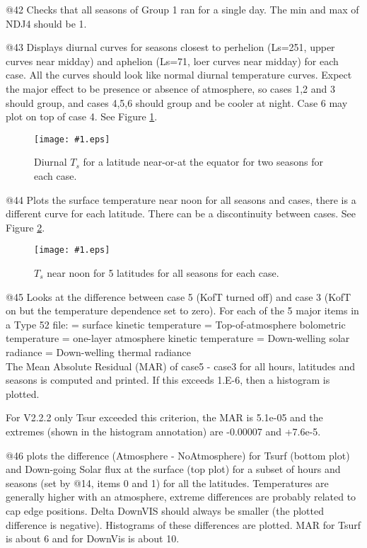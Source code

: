 \documentclass{article}  %
\newcommand{\igc}[1]{\texttt{[image: \#1.eps]}}
\begin{document}
@42 Checks that all seasons of Group 1 ran for a single day. The min and max of
NDJ4 should be 1.

@43 Displays diurnal curves for seasons closest to perhelion (Ls=251, upper
curves near midday) and aphelion (Ls=71, loer curves near midday) for each
case. All the curves should look like normal diurnal temperature curves. Expect
the major effect to be presence or absence of atmosphere, so cases 1,2 and 3
should group, and cases 4,5,6 should group and be cooler at night. Case 6 may
plot on top of case 4.  See Figure \ref{p43}. 

\begin{figure}[!ht] \igc{p43}
\caption[Ts versus Hour] { Diurnal $T_s$ for a latitude near-or-at the equator for two seasons for each case.
\label{p43} } \end{figure}

@44 Plots the surface temperature near noon for all seasons and cases, there is
a different curve for each latitude. There can be a discontinuity between
cases. See Figure \ref{p44}.

\begin{figure}[!ht] \igc{p44}
\caption[Ts versus season and latitude] { $T_s$ near noon for 5 latitudes for all seasons for each case.
\label{p44} } \end{figure}

@45 Looks at the difference between case 5 (KofT turned off) and case 3 (KofT on but the temperature dependence set to zero). For each of the 5 major items in a Type 52 file:
= surface kinetic temperature
= Top-of-atmosphere bolometric temperature
= one-layer atmosphere kinetic temperature
= Down-welling solar radiance 
= Down-welling thermal radiance
\\ The Mean Absolute Residual (MAR) of case5 - case3 for all hours, latitudes and seasons is computed and printed. If this exceeds 1.E-6, then a histogram is plotted.

For V2.2.2 only Tsur exceeded this criterion, the MAR is 5.1e-05 and the
extremes (shown in the histogram annotation) are -0.00007 and +7.6e-5.

@46 plots the difference (Atmosphere - NoAtmosphere) for Tsurf (bottom plot) and
Down-going Solar flux at the surface (top plot) for a subset of hours and
seasons (set by @14, items 0 and 1) for all the latitudes. Temperatures are
generally higher with an atmosphere, extreme differences are probably related to
cap edge positions. Delta DownVIS should always be smaller (the plotted
difference is negative).  Histograms of these differences are plotted.  MAR for
Tsurf is about 6 and for DownVis is about 10.
\end{document}
